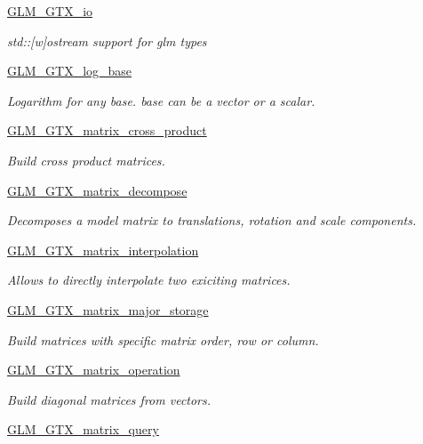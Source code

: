 \begin{DoxyCompactItemize}
\hyperlink{group__gtx__io}{G\-L\-M\-\_\-\-G\-T\-X\-\_\-io}
\begin{DoxyCompactList}\small\item\em std\-:\-:\mbox{[}w\mbox{]}ostream support for glm types \end{DoxyCompactList}\item 
\hyperlink{group__gtx__log__base}{G\-L\-M\-\_\-\-G\-T\-X\-\_\-log\-\_\-base}
\begin{DoxyCompactList}\small\item\em Logarithm for any base. base can be a vector or a scalar. \end{DoxyCompactList}\item 
\hyperlink{group__gtx__matrix__cross__product}{G\-L\-M\-\_\-\-G\-T\-X\-\_\-matrix\-\_\-cross\-\_\-product}
\begin{DoxyCompactList}\small\item\em Build cross product matrices. \end{DoxyCompactList}\item 
\hyperlink{group__gtx__matrix__decompose}{G\-L\-M\-\_\-\-G\-T\-X\-\_\-matrix\-\_\-decompose}
\begin{DoxyCompactList}\small\item\em Decomposes a model matrix to translations, rotation and scale components. \end{DoxyCompactList}\item 
\hyperlink{group__gtx__matrix__interpolation}{G\-L\-M\-\_\-\-G\-T\-X\-\_\-matrix\-\_\-interpolation}
\begin{DoxyCompactList}\small\item\em Allows to directly interpolate two exiciting matrices. \end{DoxyCompactList}\item 
\hyperlink{group__gtx__matrix__major__storage}{G\-L\-M\-\_\-\-G\-T\-X\-\_\-matrix\-\_\-major\-\_\-storage}
\begin{DoxyCompactList}\small\item\em Build matrices with specific matrix order, row or column. \end{DoxyCompactList}\item 
\hyperlink{group__gtx__matrix__operation}{G\-L\-M\-\_\-\-G\-T\-X\-\_\-matrix\-\_\-operation}
\begin{DoxyCompactList}\small\item\em Build diagonal matrices from vectors. \end{DoxyCompactList}\item 
\hyperlink{group__gtx__matrix__query}{G\-L\-M\-\_\-\-G\-T\-X\-\_\-matrix\-\_\-query}

\end{DoxyCompactItemize}
